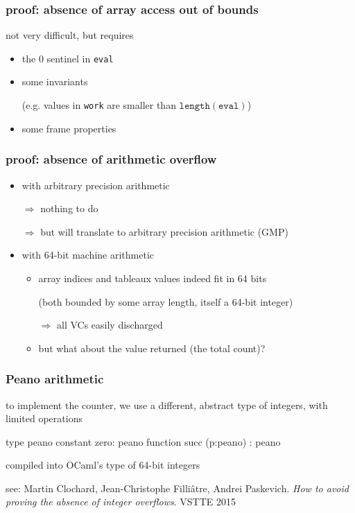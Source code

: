 \documentclass{beamer}
\begin{document}
\begin{frame}\frametitle{proof: absence of array access out of bounds}
  not very difficult, but requires
  \begin{itemize}
  \item the 0 sentinel in \texttt{eval} \par
  \item some invariants \par (e.g. values in \texttt{work} are smaller than
    $\mathtt{length}(\mathtt{eval})$)
  \item some frame properties
  \end{itemize}
\end{frame}

\begin{frame}\frametitle{proof: absence of arithmetic overflow}
  \begin{itemize}
  \item with arbitrary precision arithmetic \par
    $\Rightarrow$ nothing to do \par
    $\Rightarrow$ but will translate to arbitrary precision arithmetic (GMP)

  \bigskip
  \item with 64-bit machine arithmetic
    \begin{itemize}
    \item array indices and tableaux values indeed fit in 64 bits \par
      (both bounded by some array length, itself a 64-bit
      integer) \par
      $\Rightarrow$ all VCs easily discharged
    \item but what about the value returned (the total count)?
    \end{itemize}
  \end{itemize}
\end{frame}

\begin{frame}[fragile]\frametitle{Peano arithmetic}
  to implement the counter, we use a different, abstract type of
  integers, with limited operations
\begin{why3}
  type peano
  constant zero: peano
  function succ (p:peano) : peano
\end{why3}
  compiled into OCaml's type of 64-bit integers

\vfill
  see:
  Martin Clochard, Jean-Christophe Filli\^atre, Andrei Paskevich.
  \textit{How to avoid proving the absence of integer overflows}.
  VSTTE 2015
\end{frame}
\end{document}
